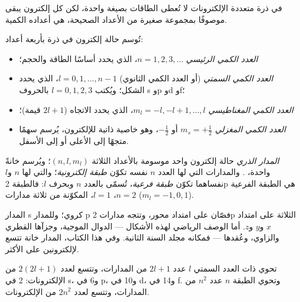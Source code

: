 في ذرة متعددة الإلكترونات لا تُعطى الطاقات بصيغة واحدة، لكن كل إلكترون
يبقى موصوفًا بمجموعة صغيرة من الأعداد الصحيحة، هي أعداده الكمية.

\begin{definition}\label{def:b1:quantum-numbers:quantum-number}
تُوسم حالة إلكترون في ذرة بأربعة أعداد:
\begin{itemize}
  \item \emph{العدد الكمي الرئيسي}
        $n = 1, 2, 3, \dots$، الذي يحدد أساسًا الطاقة والحجم؛
  \item \emph{العدد الكمي السمتي}
        (أو العدد الكمي الثانوي) $l = 0, 1, \dots, n-1$، الذي يحدد
        الشكل؛ ويُكتب $l = 0, 1, 2, 3$ بالحروف s وp وd وf؛
  \item \emph{العدد الكمي المغناطيسي}
        $m_l = -l, -l+1, \dots, l$، الذي يحدد الاتجاه ($2l + 1$
        قيمة)؛
  \item \emph{العدد الكمي المغزلي}
        $m_s = +\tfrac12$ أو $-\tfrac12$، وهو خاصية ذاتية
        للإلكترون، يُرسم سهمًا متجهًا إلى الأعلى أو إلى الأسفل.
\end{itemize}
\end{definition}

\begin{definition}\label{def:b1:quantum-numbers:orbital}
\emph{المدار الذري} حالة إلكترون واحد موسومة بالأعداد
الثلاثة $(n, l, m_l)$؛ ويُرسم خانةً واحدة،
\omorbs{}. والمدارات التي لها العدد $n$ نفسه تكوّن \emph{طبقة
إلكترونية}؛ والتي لها $n$ و$l$ نفساهما تكوّن
\emph{طبقة فرعية}، تُسمّى بالعدد $n$ وبحرف $l$:
فالطبقة 2p هي الطبقة الفرعية $n = 2$، $l = 1$، المكوّنة من ثلاثة مدارات
($m_l = -1, 0, 1$).
\end{definition}

\begin{remark}[الأشكال]\label{rem:b1:quantum-numbers:shapes}
المدار s كروي؛ وللمدار p فصّان على امتداد محور، وتتجه مدارات 2p
الثلاثة على امتداد $x$ و$y$ و$z$. أما الوصف الرياضي لهذه الأشكال
--- الدوال الموجية، وجزآها القطري والزاوي، وعُقدها --- فمكانه مجلد
السنة الثانية. وفي هذا الكتاب، المدار خانة تتسع لإلكترونين على الأكثر.
\end{remark}

\begin{proposition}\label{prop:b1:quantum-numbers:capacity}
تحوي  ذات العدد السمتي $l$ عدد $2l + 1$ من المدارات، وتتسع
لعدد $2(2l + 1)$ من الإلكترونات: 2 في s، و6 في p، و10 في d، و14 في f.
وتحوي الطبقة $n$ عدد $n^2$ من المدارات، وتتسع لعدد $2n^2$ من الإلكترونات.
\end{proposition}

